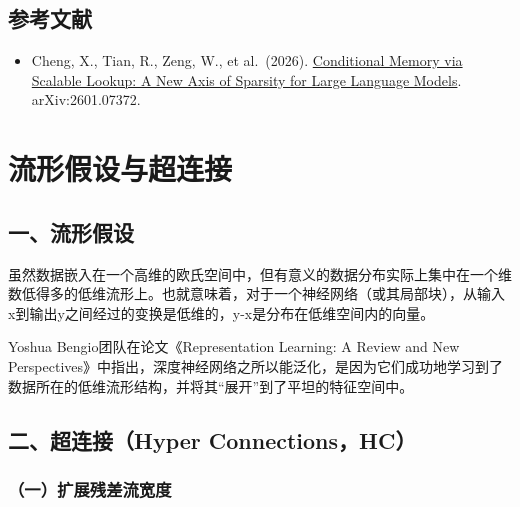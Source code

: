 \hypertarget{ux53c2ux8003ux6587ux732e-102}{%
\subsection{参考文献}\label{ux53c2ux8003ux6587ux732e-102}}

\vspace{0.25em}
\begin{itemize}
\tightlist
\item
  Cheng, X., Tian, R., Zeng, W., et al.~(2026). \href{https://arxiv.org/abs/2601.07372}{Conditional Memory via Scalable Lookup: A New Axis of Sparsity for Large Language Models}. arXiv:2601.07372.
\end{itemize}

\clearpage

\hypertarget{ux6d41ux5f62ux5047ux8bbeux4e0eux8d85ux8fdeux63a5}{%
\section{流形假设与超连接}\label{ux6d41ux5f62ux5047ux8bbeux4e0eux8d85ux8fdeux63a5}}

\hypertarget{ux4e00ux6d41ux5f62ux5047ux8bbe}{%
\subsection{一、流形假设}\label{ux4e00ux6d41ux5f62ux5047ux8bbe}}

虽然数据嵌入在一个高维的欧氏空间中，但有意义的数据分布实际上集中在一个维数低得多的低维流形上。也就意味着，对于一个神经网络（或其局部块），从输入x到输出y之间经过的变换是低维的，y-x是分布在低维空间内的向量。

Yoshua Bengio团队在论文《Representation Learning: A Review and New Perspectives》中指出，深度神经网络之所以能泛化，是因为它们成功地学习到了数据所在的低维流形结构，并将其``展开''到了平坦的特征空间中。

\hypertarget{ux4e8cux8d85ux8fdeux63a5hyper-connectionshc}{%
\subsection{二、超连接（Hyper Connections，HC）}\label{ux4e8cux8d85ux8fdeux63a5hyper-connectionshc}}

\hypertarget{ux4e00ux6269ux5c55ux6b8bux5deeux6d41ux5bbdux5ea6}{%
\subsubsection{（一）扩展残差流宽度}\label{ux4e00ux6269ux5c55ux6b8bux5deeux6d41ux5bbdux5ea6}}


